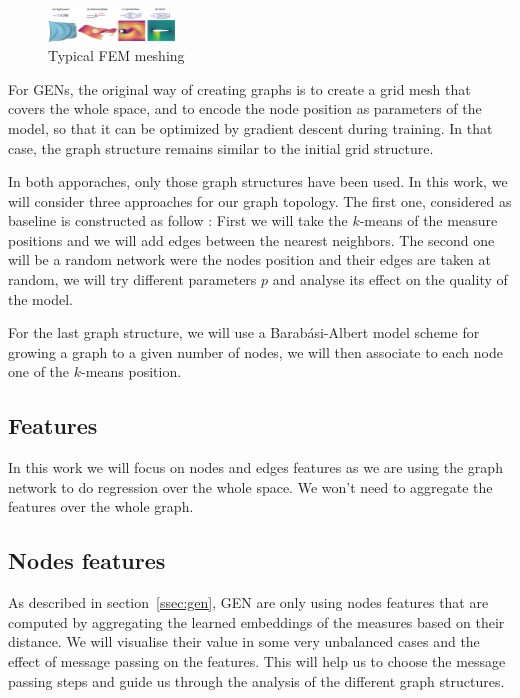 \documentclass[a4paper,10pt]{article}
\newcommand{\ap}[1]{\marginpar{{\tiny \color{red} [AP] #1}}}
\begin{document}
\begin{figure}
  \centering
  \includegraphics[trim={780 0 300 50},clip,width=0.3\textwidth]{mesh-dataset}
  \caption{Typical FEM meshing \cite{pfaff2020learning}}
\end{figure}

For GENs, the original way of creating graphs is to create a grid mesh that covers the whole space, and to encode the node position as parameters of the model, so that it can be optimized by gradient descent during training. In that case, the graph structure remains similar to the initial grid structure.

\ap{TODO : graph}

In both apporaches, only those graph structures have been used. In this work, we will consider three approaches for our graph topology. The first one, considered as baseline is constructed as follow : First we will take the $k$-means of the measure positions and we will add edges between the nearest neighbors. The second one will be a random network were the nodes position and their edges are taken at random, we will try different parameters $p$ and analyse its effect on the quality of the model.

For the last graph structure, we will use a Barab\'asi-Albert model scheme for growing a graph to a given number of nodes, we will then associate to each node one of the $k$-means position.
\ap{TODO : graph}


\subsection{Features}

In this work we will focus on nodes and edges features as we are using the graph network to do regression over the whole space. We won't need to aggregate the features over the whole graph.


\subsection{Nodes features}
As described in section~\ref{ssec:gen}, GEN are only using nodes features that are computed by aggregating the learned embeddings of the measures based on their distance. We will visualise their value in some very unbalanced cases and the effect of message passing on the features. This will help us to choose the message passing steps and guide us through the analysis of the different graph structures.
\end{document}
